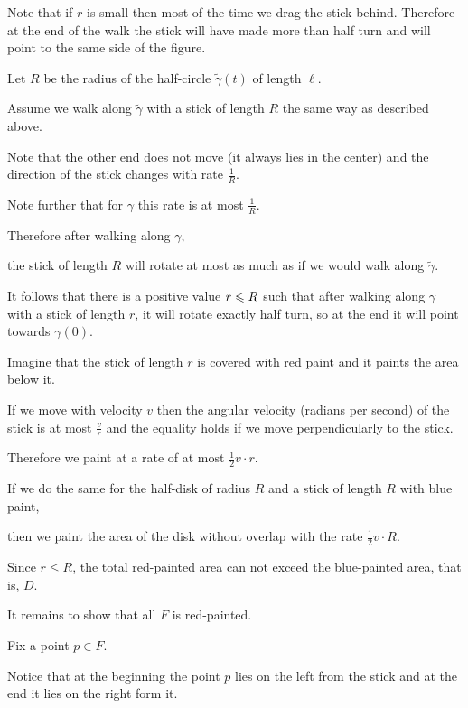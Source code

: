 Note that if $r$ is small then most of the time we drag the stick behind. Therefore at the end of the walk the stick will have made more than half turn and will point to the same side of the figure.



Let $R$ be the radius of the half-circle $\tilde\gamma(t)$ of length $\ell$.

Assume we walk along $\tilde\gamma$  with a stick of length $R$ the same way as described above.

Note that the other end does not move (it always lies in the center) and the direction of the stick changes with rate $\tfrac1R$.

Note further that for $\gamma$ this rate is at most $\tfrac1R$.

Therefore after walking along $\gamma$,

the stick of length $R$ will rotate at most as much as if we would walk along $\tilde\gamma$.



It follows that there is a positive value $r\z\le R$ such that after walking along $\gamma$ with a stick of length $r$, it will rotate exactly half turn, so at the end it will point towards $\gamma(0)$.



Imagine that the stick of length $r$ is covered with red paint and it paints the area below it.

If we move with velocity $v$ then the angular velocity (radians per second) of the stick is at most $\tfrac vr$ and the equality holds if we move perpendicularly to the stick.

Therefore we paint at a rate of at most $\tfrac12 v\cdot r$.



If we do the same for the half-disk of radius $R$ and a stick of length $R$ with blue paint,

then we paint the area of the disk without overlap with the rate $\tfrac12 v\cdot R$.

Since $r\le R$, the total red-painted area can not exceed the blue-painted area, that is, $D$. 



It remains to show that all $F$ is red-painted.

Fix a point $p\in F$.

Notice that at the beginning the point $p$ lies on the left from the stick and at the end it lies on the right form it.


